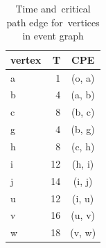 \begin{table}[htbp!]
\begin{center}
\caption{Time and~critical path edge for~vertices in event graph}\label{tab:time_crit}
\begin{tabular}{lrc}
\toprule
vertex & T & CPE \\
\midrule
a & 1 & (o, a) \\
b & 4 & (a, b) \\
c & 8 & (b, c) \\
g & 4 & (b, g) \\
h & 8 & (c, h) \\
i & 12 & (h, i) \\
j & 14 & (i, j) \\
u & 12 & (i, u) \\
v & 16 & (u, v) \\
w & 18 & (v, w) \\
\bottomrule
\end{tabular}
\end{center}
\end{table}
